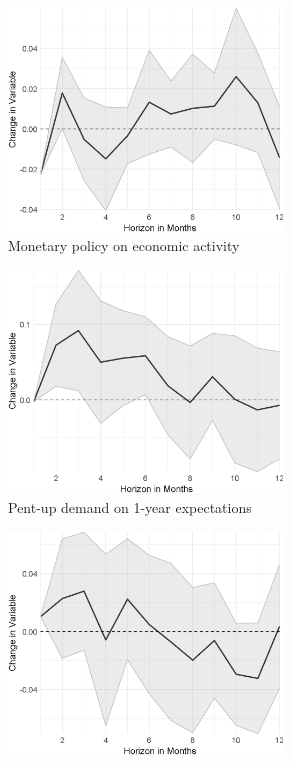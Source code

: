 \begin{figure}
\begin{subfigure}{00.24\textwidth}
		\includegraphics[width=0.8\textwidth]{output/lp/baseline/bHP/monetary_policy/monetary_policyoneconac_djn.eps}
		\caption{Monetary policy on economic activity}
	\end{subfigure}
	\begin{subfigure}{00.24\textwidth}
		\includegraphics[width=0.8\textwidth]{output/lp/baseline/bHP/pent_up_demand/pent_up_demandonexpectations1y_djn.eps}
		\caption{Pent-up demand on 1-year expectations}
	\end{subfigure}
	\begin{subfigure}{00.24\textwidth}
		\includegraphics[width=0.8\textwidth]{output/lp/baseline/bHP/pent_up_demand/pent_up_demandonexpectations3y_djn.eps}

\end{subfigure}
\end{figure}
